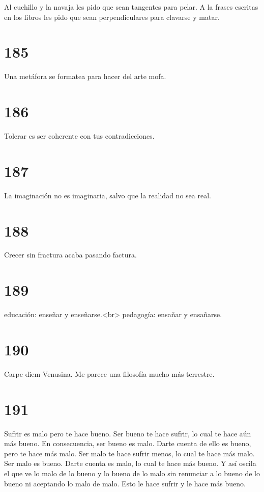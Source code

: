 \documentclass[a4paper,11pt,openright,twocolumn]{book}
\begin{document}
Al cuchillo y la navaja les pido que sean tangentes para pelar.
A la frases escritas en los libros les pido que sean perpendiculares para clavarse y matar.

\section*{185}

Una metáfora se formatea
para hacer del arte mofa.

\section*{186}

Tolerar es ser coherente con tus contradicciones.

\section*{187}

La imaginación no es imaginaria,
salvo que la realidad no sea real.

\section*{188}

Crecer sin fractura acaba pasando factura.  

\section*{189}

educación: enseñar y enseñarse.<br>
pedagogía: ensañar y ensañarse.

\section*{190}

Carpe diem Venusina. Me parece una filosofía mucho más terrestre.


\section*{191}

Sufrir es malo pero te hace bueno. Ser bueno te hace sufrir, lo cual
te hace aún más bueno. En consecuencia, ser bueno es malo. Darte cuenta
de ello es bueno, pero te hace más malo. Ser malo te hace sufrir menos,
lo cual te hace más malo. Ser malo es bueno. Darte cuenta es malo, 
lo cual te hace más bueno. Y así oscila el que ve lo malo de lo bueno
y lo bueno de lo malo sin renunciar a lo bueno de lo bueno ni 
aceptando lo malo de malo. Esto le hace sufrir y le hace más bueno. 
\end{document}
